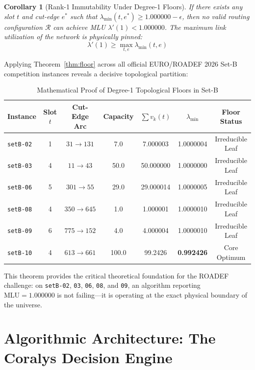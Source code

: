 \documentclass[10pt,journal,compsoc]{IEEEtran}
\newtheorem{corollary}{Corollary}
\begin{document}
\begin{corollary}[Rank-1 Immutability Under Degree-1 Floors]
If there exists any slot $t$ and cut-edge $e^*$ such that $\lambda_{\min}(t, e^*) \ge 1.000000 - \epsilon$, then no valid routing configuration $\mathcal{R}$ can achieve MLU $\lambda'(1) < 1.000000$. The maximum link utilization of the network is physically pinned:
\begin{equation}
\lambda'(1) \ge \max_{t, e} \lambda_{\min}(t, e)
\end{equation}
\end{corollary}

Applying Theorem~\ref{thm:floor} across all official EURO/ROADEF 2026 Set-B competition instances reveals a decisive topological partition:

\begin{table}[h]
\centering
\caption{Mathematical Proof of Degree-1 Topological Floors in Set-B}
\label{tab:topo_floors}
\begin{tabular}{lcccccc}
\toprule
\textbf{Instance} & \textbf{Slot $t$} & \textbf{Cut-Edge Arc} & \textbf{Capacity} & $\sum v_k(t)$ & $\lambda_{\min}$ & \textbf{Floor Status} \\
\midrule
\texttt{setB-02} & 1 & $31 \to 131$ & 7.0 & 7.000003 & 1.0000004 & Irreducible Leaf \\
\texttt{setB-03} & 4 & $11 \to 43$  & 50.0 & 50.000000 & 1.0000000 & Irreducible Leaf \\
\texttt{setB-06} & 5 & $301 \to 55$ & 29.0 & 29.000014 & 1.0000005 & Irreducible Leaf \\
\texttt{setB-08} & 4 & $350 \to 645$ & 1.0 & 1.000001 & 1.0000010 & Irreducible Leaf \\
\texttt{setB-09} & 6 & $775 \to 152$ & 4.0 & 4.000004 & 1.0000010 & Irreducible Leaf \\
\midrule
\texttt{setB-10} & 4 & $613 \to 661$ & 100.0 & 99.2426 & \textbf{0.992426} & Core Optimum \\
\bottomrule
\end{tabular}
\end{table}

This theorem provides the critical theoretical foundation for the ROADEF challenge: on \texttt{setB-02}, \texttt{03}, \texttt{06}, \texttt{08}, and \texttt{09}, an algorithm reporting $\text{MLU} = 1.000000$ is not failing—it is operating at the exact physical boundary of the universe.

\section{Algorithmic Architecture: The Coralys Decision Engine}
\end{document}
